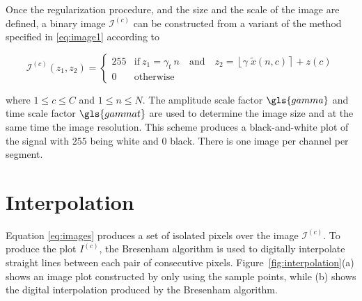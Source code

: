 Once the regularization procedure, and the size and the scale of the image are defined,  a binary image $\mathcal{I}^{(c)}$ can be constructed from a variant of the method specified in \ref{eq:image1} according to

\begin{equation}
\mathcal{I}^{(c)}(z_1,z_2) = \left\{ \begin{array}{rl}
255 & \text{if} \   z_1 = \gamma_{t} \  n \quad \text{and}  \quad z_2 = \left\lfloor \gamma \; \tilde{x}(n,c) \right\rceil + z(c) \\
0   & \mbox{otherwise}
\end{array}\right.
\label{eq:images}
\end{equation}

\noindent  where  $1 \leq c \leq C$ and $1 \leq n \leq N$. The amplitude scale factor $\gls{gamma}$ and time scale factor $\gls{gammat}$ are used to determine the image size and at the same time the image resolution. This scheme produces a black-and-white plot of the signal with $255$ being white and $0$ black.  There is one image per channel per segment. 


\section{Interpolation}

Equation \ref{eq:images} produces a set of isolated pixels over the image $\mathcal{I}^{(c)}$.  To produce the plot $I^{(c)}$, the Bresenham \cite{Bresenham1965,Ramele2016} algorithm is used to digitally interpolate straight lines between each pair of consecutive pixels.  Figure~\ref{fig:interpolation}(a) shows an image plot constructed by only using the sample points, while (b) shows the digital interpolation produced by the Bresenham algorithm.

